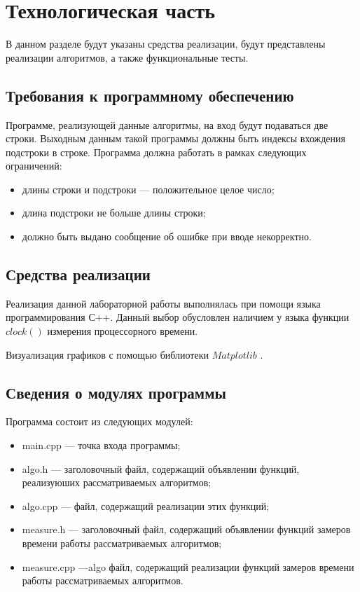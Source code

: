 \chapter{Технологическая часть}

В данном разделе будут указаны средства реализации, будут представлены реализации алгоритмов, а также функциональные тесты.

\section{Требования к программному обеспечению}
Программе, реализующей данные алгоритмы, на вход будут подаваться две строки. Выходным данным такой программы должны быть индексы вхождения подстроки в строке. Программа должна работать в рамках следующих ограничений: 

\begin{itemize}
	\item длины строки и подстроки --- положительное целое число;
	\item длина подстроки не больше длины строки;
	\item должно быть выдано сообщение об ошибке при вводе некорректно.
\end{itemize}


\section{Средства реализации}
Реализация данной лабораторной работы выполнялась при помощи языка программирования С++. Данный выбор обусловлен наличием у языка функции $clock()$ \cite {clock} измерения процессорного времени.

Визуализация графиков с помощью библиотеки $Matplotlib$ \cite {matplot}.

\section{Сведения о модулях программы}

Программа состоит из следующих модулей:

\begin{itemize}
	\item main.cpp --- точка входа программы;
	\item algo.h --- заголовочный файл, содержащий объявлении функций, реализуюших рассматриваемых алгоритмов;
	\item algo.cpp --- файл, содержащий реализации этих функций;
	\item measure.h --- заголовочный файл, содержащий объявлении функций замеров времени работы рассматриваемых алгоритмов;
	\item measure.cpp ---algo файл, содержащий реализации функций замеров времени работы рассматриваемых алгоритмов.
\end{itemize}


